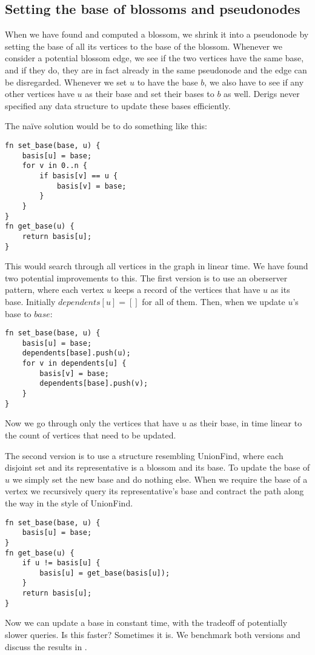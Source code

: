 \subsection{Setting the base of blossoms and pseudonodes}
\label{subsection:basis-code}
When we have found and computed a blossom, we shrink it into a pseudonode by setting the base of all its vertices to the base of the blossom. Whenever we consider a potential blossom edge, we see if the two vertices have the same base, and if they do, they are in fact already in the same pseudonode and the edge can be disregarded. Whenever we set $u$ to have the base $b$, we also have to see if any other vertices have $u$ as their base and set their bases to $b$ as well. Derigs never specified any data structure to update these bases efficiently.

The naïve solution would be to do something like this:
\begin{lstlisting}[caption={Näive basis},label=Listing,mathescape=true]
fn set_base(base, u) {
    basis[u] = base;
    for v in 0..n {
        if basis[v] == u {
            basis[v] = base;
        }
    }
}
fn get_base(u) {
    return basis[u];
}
\end{lstlisting}
This would search through all vertices in the graph in linear time. We have found two potential improvements to this. The first version is to use an oberserver pattern, where each vertex $u$ keeps a record of the vertices that have $u$ as its base. Initially $dependents[u] = []$ for all of them. Then, when we update $u$'s base to $base$:

\begin{lstlisting}[caption={Observer basis},label=Listing,mathescape=true]
fn set_base(base, u) {
    basis[u] = base;
    dependents[base].push(u);
    for v in dependents[u] {
        basis[v] = base;
        dependents[base].push(v);
    }
}
\end{lstlisting}

Now we go through only the vertices that have $u$ as their base, in time linear to the count of vertices that need to be updated.

The second version is to use a structure resembling UnionFind, where each disjoint set and its representative is a blossom and its base. To update the base of $u$ we simply set the new base and do nothing else. When we require the base of a vertex we recursively query its representative's base and contract the path along the way in the style of UnionFind. 

\begin{lstlisting}[caption={UF-like basis},label=Listing,mathescape=true]
fn set_base(base, u) {
    basis[u] = base;
}
fn get_base(u) {
    if u != basis[u] {
        basis[u] = get_base(basis[u]);
    }
    return basis[u];
}

\end{lstlisting}

Now we can update a base in constant time, with the tradeoff of potentially slower queries. Is this faster? Sometimes it is. We benchmark both versions and discuss the results in .
